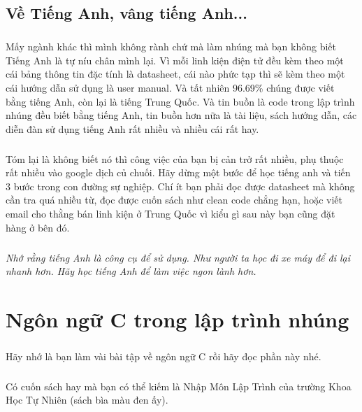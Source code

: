 \documentclass[12pt,a5paper]{book}
\begin{document}
	\section{Về Tiếng Anh, vâng tiếng Anh...}
		\paragraph{}
	Mấy ngành khác thì mình không rành chứ mà làm nhúng mà bạn không biết Tiếng Anh là tự níu chân mình lại. Vì mỗi linh kiện điện tử đều kèm theo một cái bảng thông tin đặc tính là datasheet, cái nào phức tạp thì sẽ kèm theo một cái hướng dẫn sử dụng là user manual. Và tất nhiên 96.69\% chúng được viết bằng tiếng Anh, còn lại là tiếng Trung Quốc. Và tin buồn là code trong lập trình nhúng đều biết bằng tiếng Anh, tin buồn hơn nữa là tài liệu, sách hướng dẫn, các diễn đàn sử dụng tiếng Anh rất nhiều và nhiều cái rất hay.
		\paragraph{}
	Tóm lại là không biết nó thì công việc của bạn bị cản trở rất nhiều, phụ thuộc rất nhiều vào google dịch củ chuối. Hãy dừng một bước để học tiếng anh và tiến 3 bước trong con đường sự nghiệp. Chí ít bạn phải đọc được datasheet mà không cần tra quá nhiều từ, đọc được cuốn sách như clean code chẳng hạn, hoặc viết email cho thằng bán linh kiện ở Trung Quốc vì kiểu gì sau này bạn cũng đặt hàng ở bên đó.
		\paragraph{}
	\textit{Nhớ rằng tiếng Anh là công cụ để sử dụng. Như người ta học đi xe máy để đi lại nhanh hơn. Hãy học tiếng Anh để làm việc ngon lành hơn.}


	\chapter{Ngôn ngữ C trong lập trình nhúng}
	\paragraph{}
Hãy nhớ là bạn làm vài bài tập về ngôn ngữ C rồi hãy đọc phần này nhé.
	\paragraph{}
Có cuốn sách hay mà bạn có thể kiếm là Nhập Môn Lập Trình của trường Khoa Học Tự Nhiên (sách bìa màu đen ấy).\\
\end{document}
